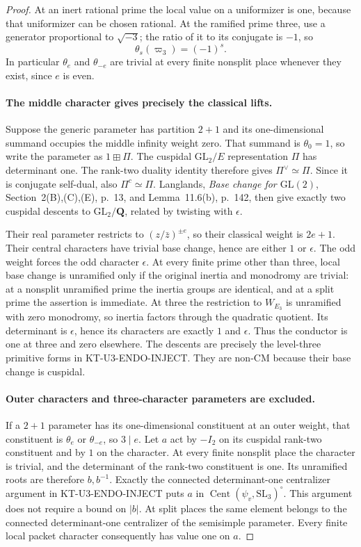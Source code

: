 \begin{proof}
At an inert rational prime the local value on a uniformizer is one,
because that uniformizer can be chosen rational. At the ramified
prime three, use a generator proportional to $\sqrt{-3}$; the ratio
of it to its conjugate is $-1$, so
\[
                  \theta_s(\varpi_3)=(-1)^s.
\]
In particular $\theta_e$ and $\theta_{-e}$ are trivial at every
finite nonsplit place whenever they exist, since $e$ is even.

\paragraph{The middle character gives precisely the classical lifts.}
Suppose the generic parameter has partition $2+1$ and its
one-dimensional summand occupies the middle infinity weight zero.
That summand is $\theta_0=1$, so write the parameter as $1\boxplus\Pi$.
The cuspidal $\mathrm{GL}_2/E$ representation $\Pi$ has determinant
one. The rank-two duality identity therefore gives
$\Pi^\vee\simeq\Pi$. Since it is conjugate self-dual, also
$\Pi^c\simeq\Pi$. Langlands, \emph{Base change for $\mathrm{GL}(2)$},
Section~2(B),(C),(E), p.~13, and Lemma~11.6(b), p.~142,
then give exactly two cuspidal descents to $\mathrm{GL}_2/\mathbf Q$,
related by twisting with $\epsilon$.

Their real parameter restricts to $(z/\bar z)^{\pm e}$, so their
classical weight is $2e+1$. Their central characters have trivial
base change, hence are either $1$ or $\epsilon$. The odd weight
forces the odd character $\epsilon$.
At every finite prime other than three, local base change is
unramified only if the original inertia and monodromy are trivial:
at a nonsplit unramified prime the inertia groups are identical,
and at a split prime the assertion is immediate.
At three the restriction to $W_{E_3}$ is unramified with zero
monodromy, so inertia factors through the quadratic quotient.
Its determinant is $\epsilon$, hence its characters are exactly
$1$ and $\epsilon$. Thus the conductor is one at three and zero
elsewhere. The descents are precisely the level-three primitive
forms in KT-U3-ENDO-INJECT. They are non-CM because their base
change is cuspidal.

\paragraph{Outer characters and three-character parameters are excluded.}
If a $2+1$ parameter has its one-dimensional constituent at an
outer weight, that constituent is $\theta_e$ or $\theta_{-e}$,
so $3\mid e$. Let $a$ act by $-I_2$ on its cuspidal rank-two
constituent and by $1$ on the character. At every finite nonsplit
place the character is trivial, and the determinant of the
rank-two constituent is one. Its unramified roots are therefore
$b,b^{-1}$. Exactly the connected determinant-one centralizer
argument in KT-U3-ENDO-INJECT puts $a$ in
$\operatorname{Cent}(\psi_v,\mathrm{SL}_3)^\circ$.
This argument does not require a bound on $|b|$.
At split places the same element belongs to the connected
determinant-one centralizer of the semisimple parameter.
Every finite local packet character consequently has value one
on $a$.


\end{proof}
